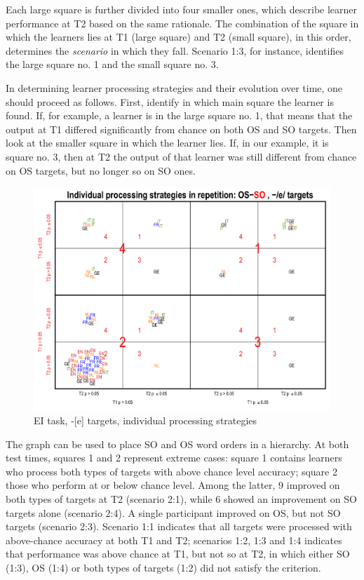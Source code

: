 Each large square is further divided into four smaller ones, which describe learner performance at T2 based on the same rationale. The combination of the square in which the learners lies at T1 (large square) and T2 (small square), in this order, determines the \textit{scenario} in which they fall. Scenario 1:3, for instance, identifies the large square no. 1 and the small square no. 3.

In determining learner processing strategies and their evolution over time, one should proceed as follows. First, identify in which main square the learner is found. If, for example, a learner is in the large square no. 1, that means that the output at T1 differed significantly from chance on both OS and SO targets. Then look at the smaller square in which the learner lies. If, in our example, it is square no. 3, then at T2 the output of that learner was still different from chance on OS targets, but no longer so on SO ones.

\begin{figure}
    \includegraphics[width=\textwidth]{figures/04-5.pdf}
    \caption{EI task, -[e] targets, individual processing strategies}
    \label{fig:04:5}
\end{figure}

The graph can be used to place SO and OS word orders in a hierarchy. At both test times, squares 1 and 2 represent extreme cases: square 1 contains learners who process both types of targets with above chance level accuracy; square 2 those who perform at or below chance level. Among the latter, 9 improved on both types of targets at T2 (scenario 2:1), while 6 showed an improvement on SO targets alone (scenario 2:4). A single participant improved on OS, but not SO targets (scenario 2:3). Scenario 1:1 indicates that all targets were processed with above-chance accuracy at both T1 and T2; scenarios 1:2, 1:3 and 1:4 indicates that performance was above chance at T1, but not so at T2, in which either SO (1:3), OS (1:4) or both types of targets (1:2) did not satisfy the criterion.

